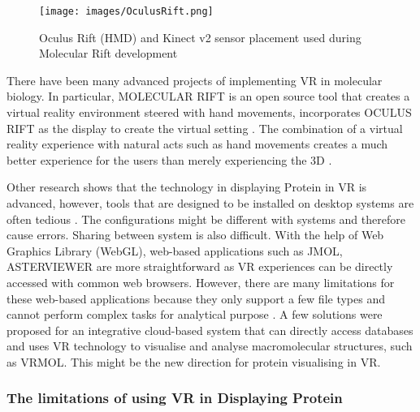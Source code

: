 \begin{figure}[!htp]
	\centering
	\texttt{[image: images/OculusRift.png]}
	\caption{Oculus Rift (HMD) and Kinect v2 sensor placement used during Molecular Rift development}
	\label{fig:OculusRift}
\end{figure}


There have been many advanced projects of implementing VR in molecular biology. In particular,  {\footnotesize MOLECULAR RIFT} is an open source tool that creates a virtual reality environment steered with hand movements, incorporates {\footnotesize OCULUS RIFT} as the display to create the virtual setting \parencite{norrby_molecular_2015}. The combination of a virtual reality experience with natural acts such as hand movements creates a much better experience for the users than merely experiencing the 3D \parencite{norrby_molecular_2015}.

Other research shows that the technology in displaying Protein in VR is advanced, however, tools that are designed to be installed on desktop systems are often tedious \parencite{xu_vrmol_2019}.  The configurations might be different with systems and therefore cause errors. Sharing between system is also difficult. With the help of Web Graphics Library (WebGL), web-based applications such as {\footnotesize JMOL}, {\footnotesize ASTERVIEWER} are more straightforward as VR experiences can be directly accessed with common web browsers. However, there are many limitations for these web-based applications because they only support a few file types and cannot perform complex tasks for analytical purpose \parencite{xu_vrmol_2019}. A few solutions were proposed for an integrative cloud-based system that can directly access databases and uses VR technology to visualise and analyse macromolecular structures, such as {\footnotesize VRMOL}. This might be the new direction for protein visualising in VR.

\subsubsection{The limitations of using VR in Displaying Protein}

